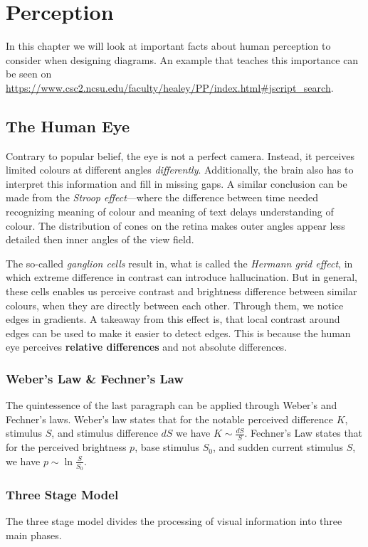 \chapter{Perception}
In this chapter we will look at important facts about human perception to consider when designing diagrams.
An example that teaches this importance can be seen on \url{https://www.csc2.ncsu.edu/faculty/healey/PP/index.html#jscript_search}.

\section{The Human Eye}
Contrary to popular belief, the eye is not a perfect camera.
Instead, it perceives limited colours at different angles \emph{differently}.
Additionally, the brain also has to interpret this information and fill in missing gaps.
A similar conclusion can be made from the \emph{Stroop effect}---where the difference between time needed recognizing meaning of colour and meaning of text delays understanding of colour.
The distribution of cones on the retina makes outer angles appear less detailed then inner angles of the view field.

The so-called \emph{ganglion cells} result in, what is called the \emph{Hermann grid effect}, in which extreme difference in contrast can introduce hallucination.
But in general, these cells enables us perceive contrast and brightness difference between similar colours, when they are directly between each other.
Through them, we notice edges in gradients.
A takeaway from this effect is, that local contrast around edges can be used to make it easier to detect edges.
This is because the human eye perceives \textbf{relative differences} and not absolute differences.

\subsection{Weber's Law \& Fechner's Law}
The quintessence of the last paragraph can be applied through Weber's and Fechner's laws.
Weber's law states that for the notable perceived difference \(K\), stimulus \(S\), and stimulus difference \(dS\) we have \(K \sim \frac{dS}{S}\).
Fechner's Law states that for the perceived brightness \(p\), base stimulus \(S_0\), and sudden current stimulus \(S\), we have \(p \sim \ln \frac{S}{S_0}\).

\subsection{Three Stage Model}
The three stage model divides the processing of visual information into three main phases.

